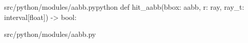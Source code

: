 \begin{fileminted}{src/python/modules/aabb.py}{python}
def hit_aabb(bbox: aabb, r: ray, ray_t: interval[float]) -> bool: 
\end{fileminted}{src/python/modules/aabb.py}